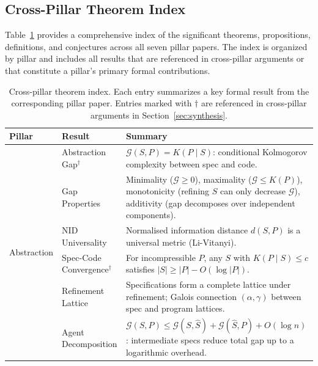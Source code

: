 \begin{appendices}

\section{Cross-Pillar Theorem Index}
\label{app:theorems}

Table~\ref{tab:theorem-index} provides a comprehensive index of the significant theorems, propositions, definitions, and conjectures across all seven pillar papers. The index is organized by pillar and includes all results that are referenced in cross-pillar arguments or that constitute a pillar's primary formal contributions.

\begin{table}[H]
\centering
\caption{Cross-pillar theorem index. Each entry summarizes a key formal result from the corresponding pillar paper. Entries marked with $\dagger$ are referenced in cross-pillar arguments in Section~\ref{sec:synthesis}.}
\label{tab:theorem-index}
\small
\begin{tabular}{p{1.8cm}p{3.8cm}p{7.5cm}}
\toprule
\textbf{Pillar} & \textbf{Result} & \textbf{Summary} \\
\midrule

\multirow{6}{1.8cm}{Abstraction}
    & Abstraction Gap$^\dagger$ & $\mathcal{G}(S,P) = K(P \mid S)$: conditional Kolmogorov complexity between spec and code. \\
    & Gap Properties & Minimality ($\mathcal{G} \geq 0$), maximality ($\mathcal{G} \leq K(P)$), monotonicity (refining $S$ can only decrease $\mathcal{G}$), additivity (gap decomposes over independent components). \\
    & NID Universality & Normalised information distance $d(S,P)$ is a universal metric (Li-Vitanyi). \\
    & Spec-Code Convergence$^\dagger$ & For incompressible $P$, any $S$ with $K(P \mid S) \leq c$ satisfies $|S| \geq |P| - O(\log |P|)$. \\
    & Refinement Lattice & Specifications form a complete lattice under refinement; Galois connection $(\alpha, \gamma)$ between spec and program lattices. \\
    & Agent Decomposition & $\mathcal{G}(S,P) \leq \mathcal{G}(S, \hat{S}) + \mathcal{G}(\hat{S}, P) + O(\log n)$: intermediate specs reduce total gap up to a logarithmic overhead. \\


\end{tabular}
\end{table}
\end{appendices}
